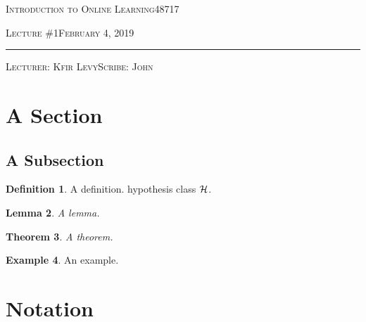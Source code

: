\documentclass[11pt]{article}
\newtheorem{theorem}{Theorem}[section]
\newtheorem{lemma}[theorem]{Lemma}
\theoremstyle{definition}
\newtheorem{definition}[theorem]{Definition}
\theoremstyle{definition}
\newtheorem{example}[theorem]{Example}
\def \lecturenum  {1}
\def \lecturedate {February 4, 2019}
\def \scribe      {John }
\begin{document}
\noindent
\begin{minipage}[t]{1\columnwidth}%
\textsc{Introduction to Online Learning}\hspace*{\fill}48717
\vspace{2mm}

\textsc{\LARGE Lecture \#\lecturenum}\hspace*{\fill}\textsc{\lecturedate}

\noindent \rule[0.5ex]{1\linewidth}{1pt}

\textsc{Lecturer: Kfir Levy\hspace*{\fill}Scribe: \scribe}
\vspace{10mm}
\end{minipage}














\section{A Section}

\subsection{A Subsection}

\begin{definition}
A definition. hypothesis class ${\mathcal H}$.
\end{definition}

\begin{lemma}
A lemma.
\end{lemma}

\begin{theorem}
A theorem.
\end{theorem}

\begin{example}
An example.
\end{example}

\section{Notation }
\end{document}
